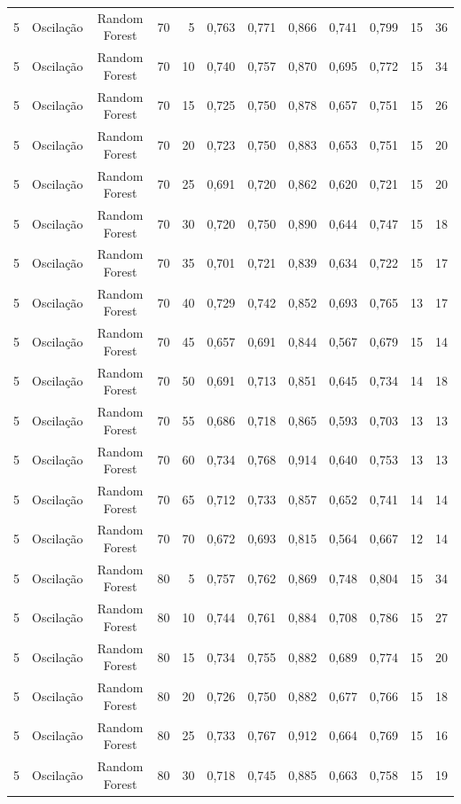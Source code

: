 \begin{longtable}{ccclrrrrrrrr}
5 & Oscilação & Random Forest & 70 & 5 & 0,763 & 0,771 & 0,866 & 0,741 & 0,799 & 15 & 36 \\
5 & Oscilação & Random Forest & 70 & 10 & 0,740 & 0,757 & 0,870 & 0,695 & 0,772 & 15 & 34 \\
5 & Oscilação & Random Forest & 70 & 15 & 0,725 & 0,750 & 0,878 & 0,657 & 0,751 & 15 & 26 \\
5 & Oscilação & Random Forest & 70 & 20 & 0,723 & 0,750 & 0,883 & 0,653 & 0,751 & 15 & 20 \\
5 & Oscilação & Random Forest & 70 & 25 & 0,691 & 0,720 & 0,862 & 0,620 & 0,721 & 15 & 20 \\
5 & Oscilação & Random Forest & 70 & 30 & 0,720 & 0,750 & 0,890 & 0,644 & 0,747 & 15 & 18 \\
5 & Oscilação & Random Forest & 70 & 35 & 0,701 & 0,721 & 0,839 & 0,634 & 0,722 & 15 & 17 \\
5 & Oscilação & Random Forest & 70 & 40 & 0,729 & 0,742 & 0,852 & 0,693 & 0,765 & 13 & 17 \\
5 & Oscilação & Random Forest & 70 & 45 & 0,657 & 0,691 & 0,844 & 0,567 & 0,679 & 15 & 14 \\
5 & Oscilação & Random Forest & 70 & 50 & 0,691 & 0,713 & 0,851 & 0,645 & 0,734 & 14 & 18 \\
5 & Oscilação & Random Forest & 70 & 55 & 0,686 & 0,718 & 0,865 & 0,593 & 0,703 & 13 & 13 \\
5 & Oscilação & Random Forest & 70 & 60 & 0,734 & 0,768 & 0,914 & 0,640 & 0,753 & 13 & 13 \\
5 & Oscilação & Random Forest & 70 & 65 & 0,712 & 0,733 & 0,857 & 0,652 & 0,741 & 14 & 14 \\
5 & Oscilação & Random Forest & 70 & 70 & 0,672 & 0,693 & 0,815 & 0,564 & 0,667 & 12 & 14 \\
5 & Oscilação & Random Forest & 80 & 5 & 0,757 & 0,762 & 0,869 & 0,748 & 0,804 & 15 & 34 \\
5 & Oscilação & Random Forest & 80 & 10 & 0,744 & 0,761 & 0,884 & 0,708 & 0,786 & 15 & 27 \\
5 & Oscilação & Random Forest & 80 & 15 & 0,734 & 0,755 & 0,882 & 0,689 & 0,774 & 15 & 20 \\
5 & Oscilação & Random Forest & 80 & 20 & 0,726 & 0,750 & 0,882 & 0,677 & 0,766 & 15 & 18 \\
5 & Oscilação & Random Forest & 80 & 25 & 0,733 & 0,767 & 0,912 & 0,664 & 0,769 & 15 & 16 \\
5 & Oscilação & Random Forest & 80 & 30 & 0,718 & 0,745 & 0,885 & 0,663 & 0,758 & 15 & 19 \\

\end{longtable}
